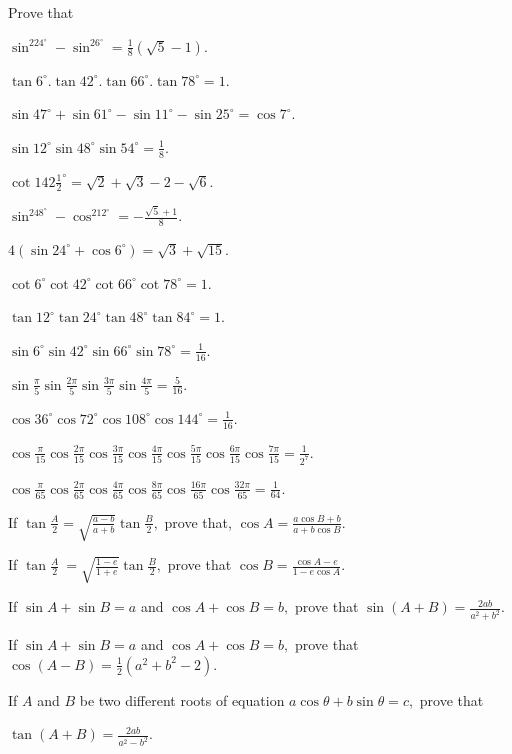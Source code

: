 Prove that

\item $\sin^224^\circ - \sin^26^\circ = \frac{1}{8}(\sqrt{5} - 1)$.
\item $\tan6^\circ.\tan42^\circ.\tan66^\circ.\tan78^\circ = 1$.
\item $\sin47^\circ + \sin61^\circ - \sin 11^\circ - \sin25^\circ = \cos 7^\circ$.
\item $\sin 12^\circ\sin48^\circ\sin54^\circ = \frac{1}{8}$.
\item $\cot 142\frac{1}{2}^\circ = \sqrt{2} + \sqrt{3} - 2 - \sqrt{6}$.
\item $\sin^248^\circ - \cos^212^\circ = -\frac{\sqrt{5} + 1}{8}$.
\item $4(\sin 24^\circ + \cos6^\circ) = \sqrt{3} + \sqrt{15}$.
\item $\cot6^\circ\cot42^\circ\cot66^\circ\cot78^\circ = 1$.
\item $\tan12^\circ\tan24^\circ\tan48^\circ\tan84^\circ = 1$.
\item $\sin6^\circ\sin42^\circ\sin66^\circ\sin78^\circ = \frac{1}{16}$.
\item $\sin\frac{\pi}{5}\sin\frac{2\pi}{5}\sin\frac{3\pi}{5}\sin\frac{4\pi}{5} = \frac{5}{16}$.
\item $\cos36^\circ\cos72^\circ\cos108^\circ\cos144^\circ = \frac{1}{16}$.
\item $\cos\frac{\pi}{15}\cos\frac{2\pi}{15}\cos\frac{3\pi}{15}\cos\frac{4\pi}{15}\cos\frac{5\pi}{15}\cos\frac{6\pi}{15}\cos\frac{7\pi}{15}
  = \frac{1}{2^7}$.
\item $\cos\frac{\pi}{65}\cos\frac{2\pi}{65}\cos\frac{4\pi}{65}\cos\frac{8\pi}{65}\cos\frac{16\pi}{65}\cos\frac{32\pi}{65} =
  \frac{1}{64}$.
\item If $\tan \frac{A}{2} = \sqrt{\frac{a - b}{a + b}}\tan \frac{B}{2},$ prove that, $\cos A = \frac{a\cos B + b}{a +
  b\cos B}$.
\item If $\tan \frac{A}{2} \ = \sqrt{\frac{1 - e}{1 + e}}\tan\frac{B}{2},$ prove that $\cos B = \frac{\cos A - e}{1 -
  e\cos A}$.
\item If $\sin A + \sin B = a$ and $\cos A + \cos B = b,$ prove that $\sin(A + B) = \frac{2ab}{a^2 + b^2}$.
\item If $\sin A + \sin B = a$ and $\cos A + \cos B = b,$ prove that $\cos(A - B) = \frac{1}{2}(a^2 + b^2 - 2)$.
\item If $A$ and $B$ be two different roots of equation $a\cos\theta + b\sin\theta = c,$ prove that
  \startitemize[a]
\item $\tan(A + B) = \frac{2ab}{a^2 - b^2}$.
